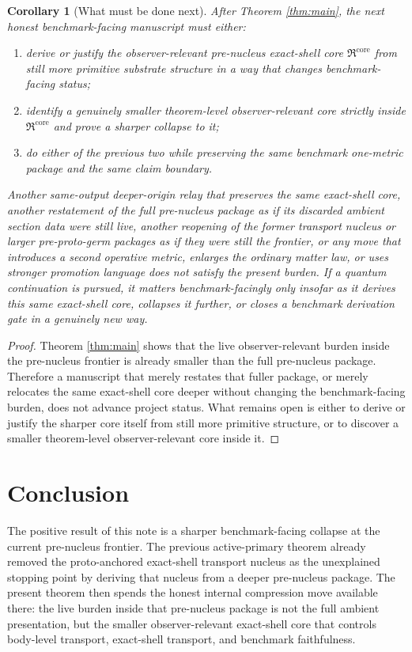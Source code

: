 \documentclass[11pt]{article}
\newcommand{\PreNucCore}{\mathfrak R^{\mathrm{core}}}
\newtheorem{corollary}{Corollary}
\begin{document}
\begin{corollary}[What must be done next]
\label{cor:next}
After Theorem \ref{thm:main}, the next honest benchmark-facing manuscript must either:
\begin{enumerate}
    \item derive or justify the observer-relevant pre-nucleus exact-shell core \(\PreNucCore\) from still more primitive substrate structure in a way that changes benchmark-facing status;
    \item identify a genuinely smaller theorem-level observer-relevant core strictly inside \(\PreNucCore\) and prove a sharper collapse to it;
    \item do either of the previous two while preserving the same benchmark one-metric package and the same claim boundary.
\end{enumerate}
Another same-output deeper-origin relay that preserves the same exact-shell core, another restatement of the full pre-nucleus package as if its discarded ambient section data were still live, another reopening of the former transport nucleus or larger pre-proto-germ packages as if they were still the frontier, or any move that introduces a second operative metric, enlarges the ordinary matter law, or uses stronger promotion language does not satisfy the present burden. If a quantum continuation is pursued, it matters benchmark-facingly only insofar as it derives this same exact-shell core, collapses it further, or closes a benchmark derivation gate in a genuinely new way.
\end{corollary}

\begin{proof}
Theorem \ref{thm:main} shows that the live observer-relevant burden inside the pre-nucleus frontier is already smaller than the full pre-nucleus package. Therefore a manuscript that merely restates that fuller package, or merely relocates the same exact-shell core deeper without changing the benchmark-facing burden, does not advance project status. What remains open is either to derive or justify the sharper core itself from still more primitive structure, or to discover a smaller theorem-level observer-relevant core inside it.
\end{proof}

\section{Conclusion}

The positive result of this note is a sharper benchmark-facing collapse at the current pre-nucleus frontier. The previous active-primary theorem already removed the proto-anchored exact-shell transport nucleus as the unexplained stopping point by deriving that nucleus from a deeper pre-nucleus package. The present theorem then spends the honest internal compression move available there: the live burden inside that pre-nucleus package is not the full ambient presentation, but the smaller observer-relevant exact-shell core that controls body-level transport, exact-shell transport, and benchmark faithfulness.
\end{document}
